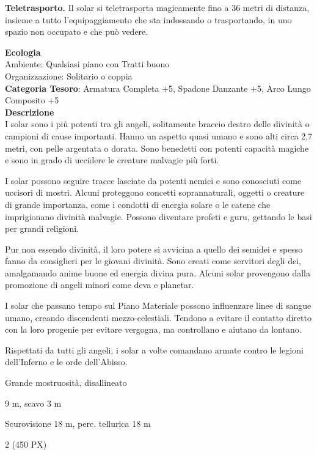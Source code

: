 \begin{multicols}{2}
{\textbf{Teletrasporto.} Il solar si teletrasporta magicamente fino a 36 metri di distanza, insieme a tutto l'equipaggiamento che sta indossando o trasportando, in uno spazio non occupato e che può vedere.

\textbf{Ecologia}\\
Ambiente: Qualsiasi piano con Tratti buono\\
Organizzazione: Solitario o coppia\\
\textbf{Categoria Tesoro}: Armatura Completa +5, Spadone Danzante +5, Arco Lungo Composito +5\\
\textbf{Descrizione}\\
I solar sono i più potenti tra gli angeli, solitamente braccio destro delle divinità o campioni di cause importanti. Hanno un aspetto quasi umano e sono alti circa 2,7 metri, con pelle argentata o dorata. Sono benedetti con potenti capacità magiche e sono in grado di uccidere le creature malvagie più forti.

I solar possono seguire tracce lasciate da potenti nemici e sono conosciuti come uccisori di mostri. Alcuni proteggono concetti soprannaturali, oggetti o creature di grande importanza, come i condotti di energia solare o le catene che imprigionano divinità malvagie. Possono diventare profeti e guru, gettando le basi per grandi religioni.

Pur non essendo divinità, il loro potere si avvicina a quello dei semidei e spesso fanno da consiglieri per le giovani divinità. Sono creati come servitori degli dei, amalgamando anime buone ed energia divina pura. Alcuni solar provengono dalla promozione di angeli minori come deva e planetar.

I solar che passano tempo sul Piano Materiale possono influenzare linee di sangue umano, creando discendenti mezzo-celestiali. Tendono a evitare il contatto diretto con la loro progenie per evitare vergogna, ma controllano e aiutano da lontano.

Rispettati da tutti gli angeli, i solar a volte comandano armate contro le legioni dell'Inferno e le orde dell'Abisso.

\begin{description}[noitemsep, topsep=0pt, parsep=0pt, partopsep=0pt, itemsep=1pt, leftmargin=2.35cm,  labelwidth=2.2cm, itemindent=0cm, listparindent=0pt] %
\setlength{\baselineskip}{10pt}
\item[\textbf{Taglia/Tipo}] Grande mostruosità, disallineato
\item[\textbf{Caratt.}] 
\item[\textbf{Punti Ferita}] 
\item[\textbf{Movimento}] 9 m, scavo 3 m
\item[\textbf{Tiri Salvez.}] 
\item[\textbf{Sensi}] Scurovisione 18 m, perc. tellurica 18 m
\item[\textbf{Sfida}] 2 (450 PX)
\end{description}
\smallskip

}
\end{multicols}
